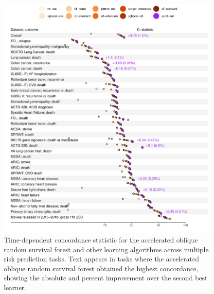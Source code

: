 \documentclass{article}\usepackage[]{graphicx}\usepackage[]{xcolor}
\makeatletter
\def\maxwidth{ %
  \ifdim\Gin@nat@width>\linewidth
    \linewidth
  \else
    \Gin@nat@width
  \fi
}
\newenvironment{knitrout}{}{} %
\makeatother
\begin{document}
\begin{knitrout}
\color{fgcolor}\begin{figure}
\includegraphics[width=\maxwidth]{figure/bm_pred_viz_cstat-1} \caption[Time-dependent concordance statistic for the accelerated oblique random survival forest and other learning algorithms across multiple risk prediction tasks]{Time-dependent concordance statistic for the accelerated oblique random survival forest and other learning algorithms across multiple risk prediction tasks. Text appears in tasks where the accelerated oblique random survival forest obtained the highest concordance, showing the absolute and percent improvement over the second best learner.}\label{fig:bm_pred_viz_cstat}
\end{figure}

\end{knitrout}
\end{document}
